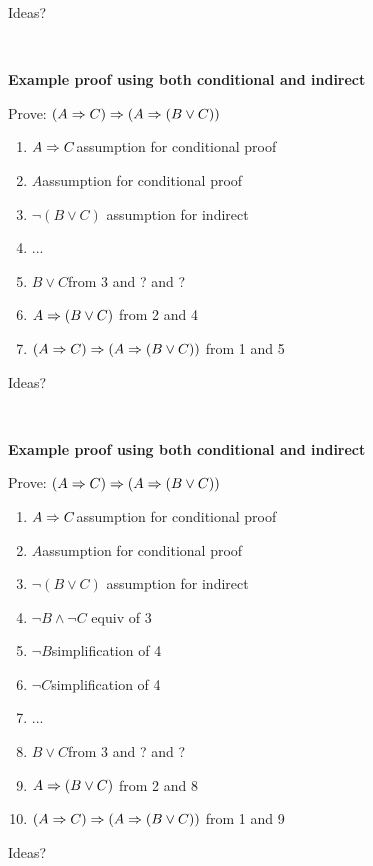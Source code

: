 \documentclass{article}
\newcommand{\ti}[1]{
\mbox{~}

\vspace{1.25in}
\centerline{\bf #1}}
\begin{document}
\bigskip
Ideas?

\newpage
\ti{Example proof using both conditional and indirect}
Prove: $(A\Rightarrow C) \Rightarrow (A\Rightarrow (B\lor C))$
\begin{enumerate}
\item \ind $A\Rightarrow C$\hfill assumption for conditional proof
\item \ind\ind $A$\hfill assumption for conditional proof
\item \ind\ind\ind $\neg(B\lor C)$ \hfill assumption for indirect
\item \ind\ind\ind ...
\item \ind\ind $B\lor C$\hfill from 3 and ? and ?
\item \ind $A\Rightarrow (B\lor C)$ \hfill from 2 and 4
\item $(A\Rightarrow C) \Rightarrow (A\Rightarrow (B\lor C))$ \hfill from 1 and 5
\end{enumerate}
\bigskip
Ideas?

\newpage
\ti{Example proof using both conditional and indirect}
Prove: $(A\Rightarrow C) \Rightarrow (A\Rightarrow (B\lor C))$
\begin{enumerate}
\item \ind $A\Rightarrow C$\hfill assumption for conditional proof
\item \ind\ind $A$\hfill assumption for conditional proof
\item \ind\ind\ind $\neg(B\lor C)$ \hfill assumption for indirect
\item \ind\ind\ind $\neg B\land \neg C$ \hfill equiv of 3
\item \ind\ind\ind $\neg B$\hfill simplification of 4
\item \ind\ind\ind $\neg C$\hfill simplification of 4
\item \ind\ind\ind...
\item \ind\ind $B\lor C$\hfill from 3 and ? and ?
\item \ind $A\Rightarrow (B\lor C)$ \hfill from 2 and 8
\item $(A\Rightarrow C) \Rightarrow (A\Rightarrow (B\lor C))$ \hfill from 1 and 9
\end{enumerate}
\bigskip
Ideas?
\end{document}
